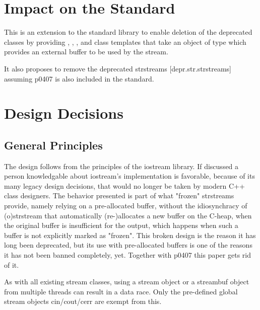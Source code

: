 \documentclass[ebook,11pt,article]{memoir}
\begin{document}
\chapter{Impact on the Standard}
This is an extension to the standard library to enable deletion of the deprecated  classes by providing , , , and  class templates that take an object of type  which provides an external buffer to be used by the stream. 

It also proposes to remove the deprecated strstreams [depr.str.strstreams] assuming p0407 is also included in the standard.

\chapter{Design Decisions}
\section{General Principles}
The design follows from the principles of the iostream library. If discussed a person knowledgable about iostream's implementation is favorable, because of its many legacy design decisions, that would no longer be taken by modern C++ class designers. The behavior presented is part of what "frozen" strstreams provide, namely relying on a pre-allocated buffer, without the idiosynchracy of (o)strstream that automatically (re-)allocates a new buffer on the C-heap, when the original buffer is insufficient for the output, which happens when such a buffer is not explicitly marked as "frozen". This broken design is the reason it has long been deprecated, but its use with pre-allocated buffers is one of the reasons it has not been banned completely, yet. Together with p0407 this paper gets rid of it.

As with all existing stream classes, using a stream object or a streambuf object from multiple threads can result in a data race. Only the pre-defined global stream objects cin/cout/cerr are exempt from this.
\end{document}
